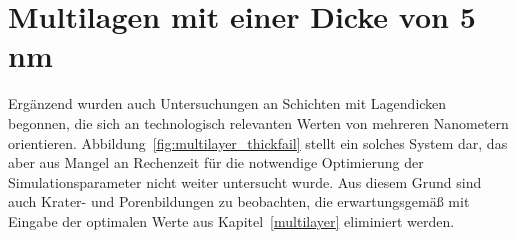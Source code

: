 \section{Multilagen mit einer Dicke von 5 nm}

Ergänzend wurden auch Untersuchungen an Schichten mit Lagendicken begonnen, die sich an technologisch relevanten Werten von mehreren Nanometern orientieren.
Abbildung~\ref{fig:multilayer_thickfail} stellt ein solches System dar, das aber aus Mangel an Rechenzeit für die notwendige Optimierung der Simulationsparameter nicht weiter untersucht wurde.
Aus diesem Grund sind auch Krater- und Porenbildungen zu beobachten, die erwartungsgemäß mit Eingabe der optimalen Werte aus Kapitel~\ref{multilayer} eliminiert werden.

